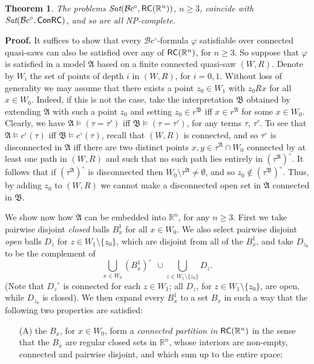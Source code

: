 \documentclass{article}
\newtheorem{theorem}{Theorem}
\newcommand{\ic}{c^\circ}
\newcommand{\NP}{\textsc{NP}}
\newcommand{\Sat}{\textit{Sat}}
\newcommand{\cBci}{\ensuremath{\mathcal{B}c^\circ}}
\newcommand{\R}{\mathbb{R}}
\newcommand{\RC}{{\sf RC}}
\newcommand{\ti}[2][]{{#2}^{\circ_{#1}}}
\newcommand{\qedsymbol}{\ding{113}}
\newenvironment{proof}{\par\noindent\textbf{Proof.}}{\mbox{}\hfill\qedsymbol\par\bigskip}
\begin{document}
\begin{theorem}
The problems $\Sat(\cBci,\RC(\R^n))$, $n \geq 3$, coincide with $\Sat(\cBci,\ConRC)$, and so are all \NP-complete.
\end{theorem}
\begin{proof}
It suffices to show that every $\cBci$-formula $\varphi$ satisfiable over connected quasi-saws can also be satisfied over any of $\RC(\R^n)$, for $n \geq 3$.
So suppose that $\varphi$ is satisfied in a model $\mathfrak{A}$ based on a finite connected quasi-saw $(W,R)$. Denote by $W_i$ the set of points of depth $i$ in $(W,R)$, for $i=0,1$.
Without loss of generality we may assume that there exists a point $z_0\in W_1$ with $z_0 R x$ for all $x\in W_0$. Indeed, if this is not the case, take the interpretation $\mathfrak B$ obtained by extending $\mathfrak A$ with such a point $z_0$ and setting $z_0 \in r^{\mathfrak B}$ iff $x \in r^{\mathfrak A}$ for some $x \in W_0$. Clearly, we have $\mathfrak A \models (\tau = \tau')$ iff $\mathfrak B \models (\tau = \tau')$, for any terms $\tau$, $\tau'$. To see that $\mathfrak A \models \ic(\tau)$ iff $\mathfrak B \models \ic(\tau)$, recall that $(W,R)$ is connected, and so $\ti{\tau}$ is disconnected in $\mathfrak A$ iff there are two distinct points $x,y \in \tau^{\mathfrak A} \cap W_0$ connected by at least one path in $(W,R)$ and such that no such path lies entirely in $\ti{(\tau^{\mathfrak A})}$. It follows that if $\ti{(\tau^{\mathfrak A})}$ is disconnected then $W_0 \setminus \tau^{\mathfrak A} \neq \emptyset$, and so $z_0 \notin \ti{(\tau^{\mathfrak B})}$.  Thus, by adding $z_0$ to $(W,R)$ we cannot make a disconnected open set in $\mathfrak A$ connected in $\mathfrak B$.

We show now how $\mathfrak{A}$ can be embedded into $\R^n$, for any $n\ge 3$.
First we take pairwise disjoint \emph{closed} balls $B^1_x$ for all $x\in W_0$. We also select pairwise disjoint \emph{open} balls $D_z$ for
$z\in W_1\setminus\{z_0\}$, which are disjoint from all of the $B^1_x$, and take $D_{z_0}$ to be the complement of
\begin{equation*}
\bigcup_{x\in W_0} \ti{(B^1_x)} \ \ \cup \bigcup_{z\in W_1\setminus\{z_0\}} D_z.
\end{equation*}
(Note that $\ti{D_z}$ is connected for each $z\in W_1$; all $D_z$, for $z\in W_1\setminus\{z_0\}$, are open, while $D_{z_0}$ is closed).
We then expand every $B^1_x$ to a set $B_x$ in such a way that the following two properties are satisfied:
\begin{itemize}
\item[(A)] the $B_x$, for $x\in W_0$, form a \emph{connected partition in $\RC(\R^n)$} in the sense that  the $B_x$ are regular closed sets in $\R^n$, whose interiors are non-empty, connected and  pairwise disjoint, and which sum up to the entire space;


\end{itemize}
\end{proof}
\end{document}
